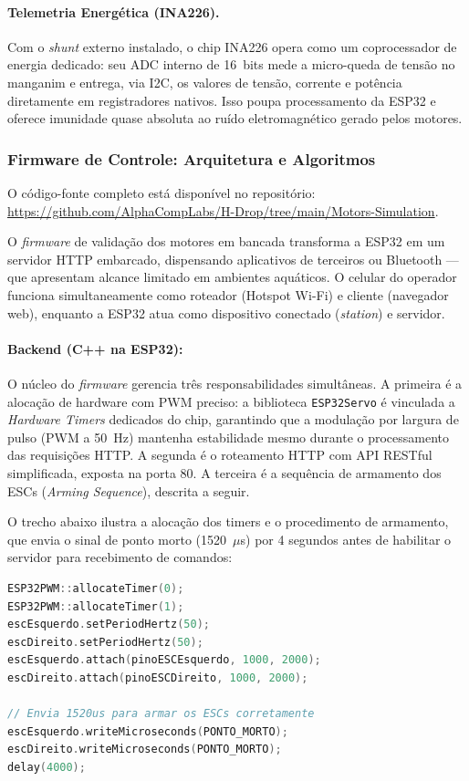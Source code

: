 \documentclass[12pt,a4paper]{article}
\begin{document}
\paragraph{Telemetria Energética (INA226).}
Com o \textit{shunt} externo instalado, o chip INA226 opera como um coprocessador de energia dedicado: seu ADC interno de 16~bits mede a micro-queda de tensão no manganim e entrega, via I2C, os valores de tensão, corrente e potência diretamente em registradores nativos. Isso poupa processamento da ESP32 e oferece imunidade quase absoluta ao ruído eletromagnético gerado pelos motores.

\subsubsection{Firmware de Controle: Arquitetura e Algoritmos}

O código-fonte completo está disponível no repositório: \url{https://github.com/AlphaCompLabs/H-Drop/tree/main/Motors-Simulation}.

O \textit{firmware} de validação dos motores em bancada transforma a ESP32 em um servidor HTTP embarcado, dispensando aplicativos de terceiros ou Bluetooth --- que apresentam alcance limitado em ambientes aquáticos. O celular do operador funciona simultaneamente como roteador (Hotspot Wi-Fi) e cliente (navegador web), enquanto a ESP32 atua como dispositivo conectado (\textit{station}) e servidor.

\paragraph{Backend (C++ na ESP32):} O núcleo do \textit{firmware} gerencia três responsabilidades simultâneas. A primeira é a alocação de hardware com PWM preciso: a biblioteca \texttt{ESP32Servo} é vinculada a \textit{Hardware Timers} dedicados do chip, garantindo que a modulação por largura de pulso (PWM a 50~Hz) mantenha estabilidade mesmo durante o processamento das requisições HTTP. A segunda é o roteamento HTTP com API RESTful simplificada, exposta na porta 80. A terceira é a sequência de armamento dos ESCs (\textit{Arming Sequence}), descrita a seguir.

O trecho abaixo ilustra a alocação dos timers e o procedimento de armamento, que envia o sinal de ponto morto (1520~$\mu$s) por 4 segundos antes de habilitar o servidor para recebimento de comandos:

\begin{lstlisting}[language=C++, caption={Alocação de timers e sequência de armamento dos ESCs (setup).}, label=lst:arming]
ESP32PWM::allocateTimer(0);
ESP32PWM::allocateTimer(1);
escEsquerdo.setPeriodHertz(50);
escDireito.setPeriodHertz(50);
escEsquerdo.attach(pinoESCEsquerdo, 1000, 2000);
escDireito.attach(pinoESCDireito, 1000, 2000);

// Envia 1520us para armar os ESCs corretamente
escEsquerdo.writeMicroseconds(PONTO_MORTO);
escDireito.writeMicroseconds(PONTO_MORTO);
delay(4000);
\end{lstlisting}
\end{document}
